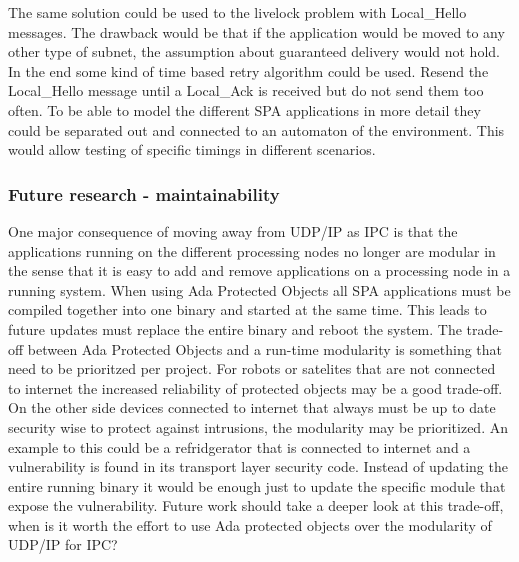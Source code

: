 The same solution could be used to the livelock problem with Local\_Hello
messages. The drawback would be that if the application would be moved to any
other type of subnet, the assumption about guaranteed delivery would not hold.
In the end some kind of time based retry algorithm could be used. Resend the
Local\_Hello message until a Local\_Ack is received but do not send them too
often. To be able to model the different SPA applications in more detail they
could be separated out and connected to an automaton of the environment. This
would allow testing of specific timings in different scenarios.

%

\subsubsection{Future research - maintainability}
One major consequence of moving away from UDP/IP as IPC is that the
applications running on the different processing nodes no longer are modular in
the sense that it is easy to add and remove applications on a processing node
in a running system. When using Ada Protected Objects all SPA applications must
be compiled together into one binary and started at the same time. This leads
to future updates must replace the entire binary and reboot the system. The
trade-off between Ada Protected Objects and a run-time modularity is something
that need to be prioritzed per project. For robots or satelites that are not
connected to internet the increased reliability of protected objects may be a
good trade-off. On the other side devices connected to internet that always
must be up to date security wise to protect against intrusions, the modularity
may be prioritized.  An example to this could be a refridgerator that is
connected to internet and a vulnerability is found in its transport layer
security code. Instead of updating the entire running binary it would be enough
just to update the specific module that expose the vulnerability. Future work
should take a deeper look at this trade-off, when is it worth the effort to use
Ada protected objects over the modularity of UDP/IP for IPC?



